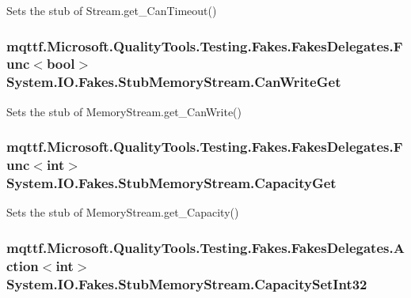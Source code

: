 Sets the stub of Stream.\-get\-\_\-\-Can\-Timeout()

\hypertarget{class_system_1_1_i_o_1_1_fakes_1_1_stub_memory_stream_a125881892963e14f093e7fa2b745456d}{
\subsubsection[{Can\-Write\-Get}]{\setlength{\rightskip}{0pt plus 5cm}mqttf.\-Microsoft.\-Quality\-Tools.\-Testing.\-Fakes.\-Fakes\-Delegates.\-Func$<$bool$>$ System.\-I\-O.\-Fakes.\-Stub\-Memory\-Stream.\-Can\-Write\-Get}}\label{class_system_1_1_i_o_1_1_fakes_1_1_stub_memory_stream_a125881892963e14f093e7fa2b745456d}


Sets the stub of Memory\-Stream.\-get\-\_\-\-Can\-Write()

\hypertarget{class_system_1_1_i_o_1_1_fakes_1_1_stub_memory_stream_a8cb7e1dd2f0e3ad20a95aef0614f20bb}{
\subsubsection[{Capacity\-Get}]{\setlength{\rightskip}{0pt plus 5cm}mqttf.\-Microsoft.\-Quality\-Tools.\-Testing.\-Fakes.\-Fakes\-Delegates.\-Func$<$int$>$ System.\-I\-O.\-Fakes.\-Stub\-Memory\-Stream.\-Capacity\-Get}}\label{class_system_1_1_i_o_1_1_fakes_1_1_stub_memory_stream_a8cb7e1dd2f0e3ad20a95aef0614f20bb}


Sets the stub of Memory\-Stream.\-get\-\_\-\-Capacity()

\hypertarget{class_system_1_1_i_o_1_1_fakes_1_1_stub_memory_stream_a927f07299b228d04eca0380b5419b877}{
\subsubsection[{Capacity\-Set\-Int32}]{\setlength{\rightskip}{0pt plus 5cm}mqttf.\-Microsoft.\-Quality\-Tools.\-Testing.\-Fakes.\-Fakes\-Delegates.\-Action$<$int$>$ System.\-I\-O.\-Fakes.\-Stub\-Memory\-Stream.\-Capacity\-Set\-Int32}}\label{class_system_1_1_i_o_1_1_fakes_1_1_stub_memory_stream_a927f07299b228d04eca0380b5419b877}


